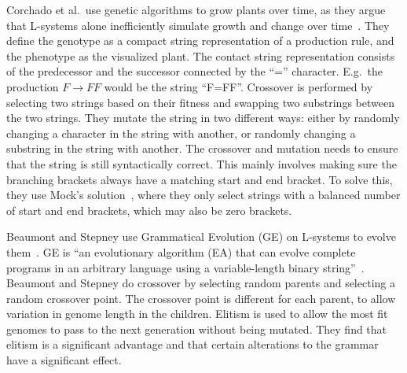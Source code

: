 Corchado et al.\ use genetic algorithms to grow plants over time, as they argue that L-systems alone inefficiently simulate growth and change over time~\cite{Corchado2009}.
They define the genotype as a compact string representation of a production rule, and the phenotype as the visualized plant.
The contact string representation consists of the predecessor and the successor connected by the ``='' character.
E.g.\ the production $F\rightarrow FF$ would be the string ``F=FF''.
Crossover is performed by selecting two strings based on their fitness and swapping two substrings between the two strings.
They mutate the string in two different ways: either by randomly changing a character in the string with another, or randomly changing a substring in the string with another.
The crossover and mutation needs to ensure that the string is still syntactically correct.
This mainly involves making sure the branching brackets always have a matching start and end bracket.
To solve this, they use Mock's solution~\cite{Mock1998}, where they only select strings with a balanced number of start and end brackets, which may also be zero brackets.

Beaumont and Stepney use Grammatical Evolution (GE) on L-systems to evolve them~\cite{Beaumont2009}.
GE is ``an evolutionary algorithm (EA) that can evolve complete programs in an arbitrary language using a variable-length binary string''~\cite{Oneil2003}.
Beaumont and Stepney do crossover by selecting random parents and selecting a random crossover point.
The crossover point is different for each parent, to allow variation in genome length in the children.
Elitism is used to allow the most fit genomes to pass to the next generation without being mutated.
They find that elitism is a significant advantage and that certain alterations to the grammar have a significant effect.

